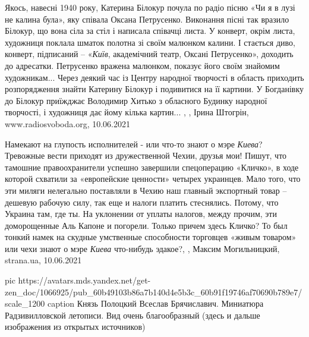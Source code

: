 Якось, навесні 1940 року, Катерина Білокур почула по радіо пісню «Чи я в лузі
не калина була», яку співала Оксана Петрусенко. Виконання пісні так вразило
Білокур, що вона сіла за стіл і написала співачці листа. У конверт, окрім
листа, художниця поклала шматок полотна зі своїм малюнком калини.  І стається
диво, конверт, підписаний – «\emph{Київ}, академічний театр, Оксані Петрусенко»,
доходить до адресатки. Петрусенко вражена малюнком, показує його своїм знайомим
художникам... Через деякий час із Центру народної творчості в область приходить
розпорядження знайти Катерину Білокур і подивитися на її картини.  У Богданівку
до Білокур приїжджає Володимир Хитько з обласного Будинку народної творчості, і
художниця дає йому кілька картин... ,
, Ірина Штогрін, www.radiosvoboda.org, 10.06.2021

Намекают на глупость исполнителей - или что-то знают о мэре \emph{Киева}?
Тревожные вести приходят из дружественной Чехии, друзья мои!  Пишут, что
тамошние правоохранители успешно завершили спецоперацию «Кличко», в ходе
которой схватили за «европейские ценности» четырех украинцев.  Мало того, что
эти миляги нелегально поставляли в Чехию наш главный экспортный товар – дешевую
рабочую силу, так еще и налоги платить стеснялись. Потому, что Украина там, где
ты. На уклонении от уплаты налогов, между прочим, эти доморощенные Аль Капоне
и погорели. Только причем здесь Кличко? То был тонкий намек на скудные
умственные способности торговцев «живым товаром» или чехи знают о мэре
\emph{Киева} что-нибудь эдакое?,
, Максим Могильницкий, strana.ua, 10.06.2021

\ifcmt
  pic https://avatars.mds.yandex.net/get-zen_doc/1066925/pub_60b49103b86a7b140d4e5b3c_60b91f19746af70690b789e7/scale_1200
  caption Князь Полоцкий Всеслав Брячиславич. Миниатюра Радзивилловской летописи. Вид очень благообразный (здесь и дальше изображения из открытых источников)
\fi

